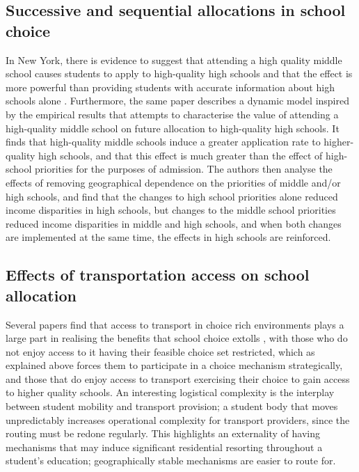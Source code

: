 \documentclass{article}
\begin{document}
\begin{multicols}{2}
\subsection{Successive and sequential allocations in school choice}
In New York, there is evidence to suggest that attending a high quality middle school causes students to apply to high-quality high schools and that the effect is more powerful than providing students with accurate information about high schools alone \cite{anderssonSequentialSchoolChoice2024}. Furthermore, the same paper describes a dynamic model inspired by the empirical results that attempts to characterise the value of attending a high-quality middle school on future allocation to high-quality high schools. It finds that high-quality middle schools induce a greater application rate to higher-quality high schools, and that this effect is much greater than the effect of high-school priorities for the purposes of admission. The authors then analyse the effects of removing geographical dependence on the priorities of middle and/or high schools, and find that the changes to high school priorities alone reduced income disparities in high schools, but changes to the middle school priorities reduced income disparities in middle and high schools, and when both changes are implemented at the same time, the effects in high schools are reinforced.

\subsection{Effects of transportation access on school allocation}
Several papers find that access to transport in choice rich environments plays a large part in realising the benefits that school choice extolls \cite{sattin-bajajStudentTransportationChoiceRich2023,trajkovskiSchoolBusesMake2021,cordesDoesPupilTransportation2018}, with those who do not enjoy access to it having their feasible choice set restricted, which as explained above forces them to participate in a choice mechanism strategically, and those that do enjoy access to transport exercising their choice to gain access to higher quality schools. An interesting logistical complexity is the interplay between student mobility and transport provision; a student body that moves unpredictably increases operational complexity for transport providers, since the routing must be redone regularly. This highlights an externality of having mechanisms that may induce significant residential resorting throughout a student's education; geographically stable mechanisms are easier to route for.


\end{multicols}
\end{document}

